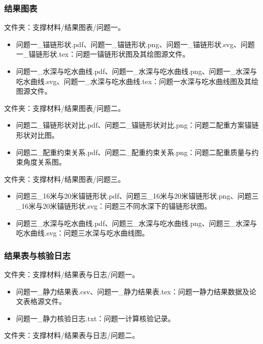 \subsubsection{结果图表}

文件夹：支撑材料/结果图表/问题一。

\begin{itemize}
  \item 问题一\_锚链形状.pdf、问题一\_锚链形状.png、问题一\_锚链形状.svg、问题一\_锚链形状.tex：问题一锚链形状图及其绘图源文件。
  \item 问题一\_水深与吃水曲线.pdf、问题一\_水深与吃水曲线.png、问题一\_水深与吃水曲线.svg、问题一\_水深与吃水曲线.tex：问题一水深与吃水曲线图及其绘图源文件。
\end{itemize}

文件夹：支撑材料/结果图表/问题二。

\begin{itemize}
  \item 问题二\_锚链形状对比.pdf、问题二\_锚链形状对比.png：问题二配重方案锚链形状对比图。
  \item 问题二\_配重约束关系.pdf、问题二\_配重约束关系.png：问题二配重质量与约束角度关系图。
\end{itemize}

文件夹：支撑材料/结果图表/问题三。

\begin{itemize}
  \item 问题三\_16米与20米锚链形状.pdf、问题三\_16米与20米锚链形状.png、问题三\_16米与20米锚链形状.svg：问题三不同水深下的锚链形状图。
  \item 问题三\_水深与吃水曲线.pdf、问题三\_水深与吃水曲线.png、问题三\_水深与吃水曲线.svg：问题三水深与吃水曲线图。
\end{itemize}

\subsubsection{结果表与核验日志}

文件夹：支撑材料/结果表与日志/问题一。

\begin{itemize}
  \item 问题一\_静力结果表.csv、问题一\_静力结果表.tex：问题一静力结果数据及论文表格源文件。
  \item 问题一\_静力核验日志.txt：问题一计算核验记录。
\end{itemize}

文件夹：支撑材料/结果表与日志/问题二。

